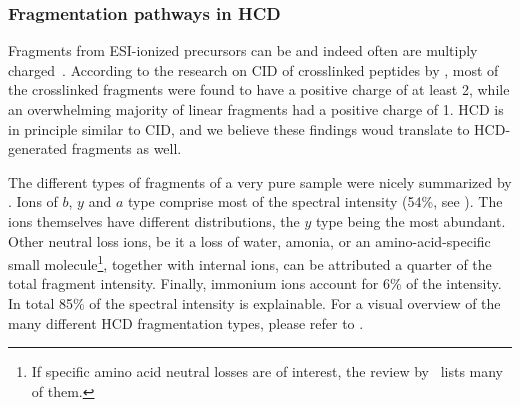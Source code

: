 \subsubsection{Fragmentation pathways in HCD}

Fragments from ESI-ionized precursors can be and indeed often are multiply charged~\cite{katta1991use, michalski2012systematic}. According to the research on CID of crosslinked peptides by \citet{giese2016study}, most of the crosslinked fragments were found to have a positive charge of at least 2, while an overwhelming majority of linear fragments had a positive charge of 1. HCD is in principle similar to CID, and we believe these findings woud translate to HCD-generated fragments as well.

The different types of fragments of a very pure sample were nicely summarized by \citet{michalski2012systematic}. Ions of \(b\), \(y\) and \(a\) type comprise most of the spectral intensity (54\%, see ). The ions themselves have different distributions, the \(y\) type being the most abundant. Other neutral loss ions, be it a loss of water, amonia, or an amino-acid-specific small molecule\footnote{If specific amino acid neutral losses are of interest, the review by~\citet{paizs2005fragmentation} lists many of them.}, together with internal ions, can be attributed a quarter of the total fragment intensity. Finally, immonium ions account for 6\% of the intensity. In total 85\% of the spectral intensity is explainable. For a visual overview of the many different HCD fragmentation types, please refer to .

